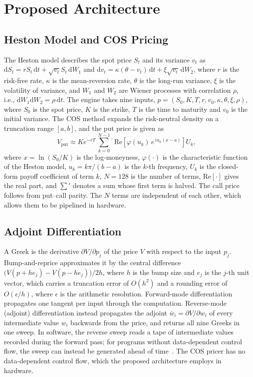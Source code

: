 \documentclass[conference]{IEEEtran}
\begin{document}
\section{Proposed Architecture}

\subsection{Heston Model and COS Pricing}
The Heston model describes the spot price $S_t$ and its variance $v_t$ as
$\mathrm{d}S_t = rS_t\,\mathrm{d}t + \sqrt{v_t}S_t\,\mathrm{d}W_1$ and
$\mathrm{d}v_t = \kappa(\theta-v_t)\,\mathrm{d}t + \xi\sqrt{v_t}\,\mathrm{d}W_2$, where $r$ is the
risk-free rate, $\kappa$ is the mean-reversion rate, $\theta$ is the long-run variance, $\xi$ is the
volatility of variance, and $W_1$ and $W_2$ are Wiener processes with correlation $\rho$, i.e.,
$\mathrm{d}W_1\mathrm{d}W_2=\rho\,\mathrm{d}t$. The engine takes nine inputs,
$p=(S_0,K,T,r,v_0,\kappa,\theta,\xi,\rho)$, where $S_0$ is the spot price, $K$ is the strike, $T$ is
the time to maturity and $v_0$ is the initial variance. The COS method expands the risk-neutral
density on a truncation range $[a,b]$, and the put price is given as
\begin{equation}
V_{\mathrm{put}} \approx K e^{-rT}\,{\sum_{k=0}^{N-1}}{}^{\prime}\,
\mathrm{Re}\!\left[\varphi(u_k)\,e^{\,iu_k(x-a)}\right] U_k,
\label{eq:cos}
\end{equation}
where $x=\ln(S_0/K)$ is the log-moneyness, $\varphi(\cdot)$ is the characteristic function of the
Heston model, $u_k=k\pi/(b-a)$ is the $k$-th frequency, $U_k$ is the closed-form payoff coefficient
of term $k$, $N=128$ is the number of terms, $\mathrm{Re}[\cdot]$ gives the real part, and
$\sum'$ denotes a sum whose first term is halved. The call price follows from put--call parity.
The $N$ terms are independent of each other, which allows them to be pipelined in hardware.

\subsection{Adjoint Differentiation}
A Greek is the derivative $\partial V/\partial p_j$ of the price $V$ with respect to the input
$p_j$. Bump-and-reprice approximates it by the central difference
$\big(V(p+he_j)-V(p-he_j)\big)/2h$, where $h$ is the bump size and $e_j$ is the $j$-th unit vector,
which carries a truncation error of $O(h^2)$ and a rounding error of $O(\epsilon/h)$, where
$\epsilon$ is the arithmetic resolution. Forward-mode differentiation propagates one tangent per
input through the computation. Reverse-mode (adjoint) differentiation instead propagates the
adjoint $\bar w_i=\partial V/\partial w_i$ of every intermediate value $w_i$ backwards from the
price, and returns all nine Greeks in one sweep. In software, the reverse sweep
reads a tape of intermediate values recorded during the forward pass; for programs
without data-dependent control flow, the sweep can instead be generated ahead of
time~\cite{enzyme}. The COS pricer has no data-dependent control flow, which the proposed
architecture employs in hardware.
\end{document}
